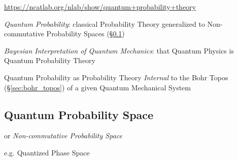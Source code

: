 \url{https://ncatlab.org/nlab/show/quantum+probability+theory}

\emph{Quantum Probability}: classical Probability Theory generalized to
Non-commutative Probability Spaces (\S\ref{sec:quantum_probability_space})

\emph{Bayesian Interpretation of Quantum Mechanics}: that Quantum Physics is
Quantum Probability Theory

Quantum Probability as Probability Theory \emph{Internal} to the Bohr Topos
(\S\ref{sec:bohr_topos}) of a given Quantum Mechanical System



\subsection{Quantum Probability Space}\label{sec:quantum_probability_space}

or \emph{Non-commutative Probability Space}

e.g. Quantized Phase Space
